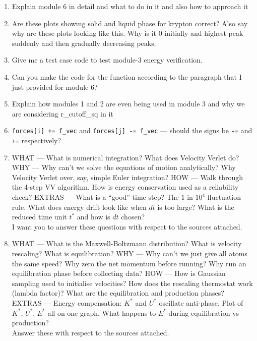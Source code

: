 \begin{enumerate}
\item Explain module 6 in detail and what to do in it and also how to approach it
\item Are these plots showing solid and liquid phase for krypton correct? Also say why are these plots looking like this. Why is it 0 initially and highest peak suddenly and then gradually decreasing peaks.
\item Give me a test case code to test module-3 energy verification.
\item Can you make the code for the function according to the paragraph that I just provided for module 6?
\item Explain how modules 1 and 2 are even being used in module 3 and why we are considering r\_cutoff\_sq in it
\item \texttt{forces[i] += f\_vec} and \texttt{forces[j] -= f\_vec} --- should the signs be \texttt{-=} and \texttt{+=} respectively?

\item WHAT --- What is numerical integration? What does Velocity Verlet do?
      WHY --- Why can't we solve the equations of motion analytically?
              Why Velocity Verlet over, say, simple Euler integration?
      HOW --- Walk through the 4-step VV algorithm.
              How is energy conservation used as a reliability check?
      EXTRAS --- What is a ``good'' time step? The 1-in-$10^4$ fluctuation rule.
                 What does energy drift look like when $dt$ is too large?
                 What is the reduced time unit $t^*$ and how is $dt$ chosen?\\
      I want you to answer these questions with respect to the sources attached.
 
\item WHAT --- What is the Maxwell-Boltzmann distribution?
              What is velocity rescaling? What is equilibration?
      WHY --- Why can't we just give all atoms the same speed?
              Why zero the net momentum before running?
              Why run an equilibration phase before collecting data?
      HOW --- How is Gaussian sampling used to initialise velocities?
              How does the rescaling thermostat work (lambda factor)?
              What are the equilibration and production phases?
      EXTRAS --- Energy compensation: $K^*$ and $U^*$ oscillate anti-phase.
                 Plot of $K^*$, $U^*$, $E^*$ all on one graph.
                 What happens to $E^*$ during equilibration vs production?\\
      Answer these with respect to the sources attached.
 

\end{enumerate}
